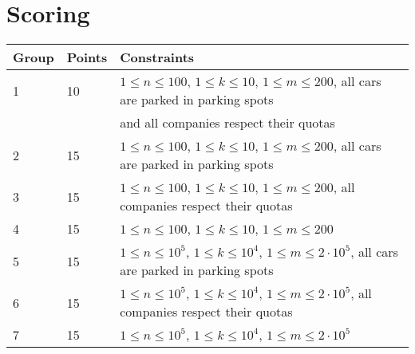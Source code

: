 \section*{Scoring}
\begin{tabular}{|l|l|l|}
\hline
Group & Points & Constraints \\ \hline
1     & 10     & $1 \leq n \leq 100$, $1 \leq k \leq 10$, $1 \leq m \leq 200$, all cars are parked in parking spots \\
      &        & and all companies respect their quotas \\ \hline
2     & 15     & $1 \leq n \leq 100$, $1 \leq k \leq 10$, $1 \leq m \leq 200$, all cars are parked in parking spots \\ \hline 
3     & 15     & $1 \leq n \leq 100$, $1 \leq k \leq 10$, $1 \leq m \leq 200$, all companies respect their quotas \\ \hline
4     & 15     & $1 \leq n \leq 100$, $1 \leq k \leq 10$, $1 \leq m \leq 200$ \\ \hline
5     & 15     & $1 \leq n \leq 10^5$, $1 \leq k \leq 10^4$, $1 \leq m \leq 2 \cdot 10^5$, all cars are parked in parking spots \\ \hline %
6     & 15     & $1 \leq n \leq 10^5$, $1 \leq k \leq 10^4$, $1 \leq m \leq 2 \cdot 10^5$, all companies respect their quotas  \\ \hline %
7     & 15     & $1 \leq n \leq 10^5$, $1 \leq k \leq 10^4$, $1 \leq m \leq 2 \cdot 10^5$ \\ \hline %
\end{tabular}
